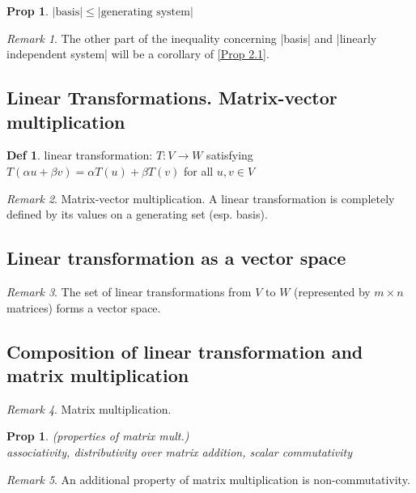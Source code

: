 \documentclass[hidelinks]{article}
\theoremstyle{definition}
\newtheorem*{defin}{Def}
\theoremstyle{plain}
\newtheorem{proposition}[theorem]{Prop}
\theoremstyle{remark}
\newtheorem*{remark}{Remark}
\begin{document}
\begin{proposition}
$|\textrm{basis}|\leq|\textrm{generating system}|$
\end{proposition}

\begin{remark}
The other part of the inequality concerning |basis| and |linearly independent system| will be a corollary of \autoref{Prop 2.1}.
\end{remark}

\subsection{Linear Transformations. Matrix-vector multiplication}

\begin{defin}
linear transformation: $T:V\to W$ satisfying $T(\alpha u+\beta v)=\alpha T(u)+\beta T(v)$ for all $u,v\in V$
\end{defin}

\begin{remark}
Matrix-vector multiplication. A linear transformation is completely defined by its values on a generating set (esp. basis).
\end{remark}

\subsection{Linear transformation as a vector space}

\begin{remark}
The set of linear transformations from $V$ to $W$ (represented by $m\times n$ matrices) forms a vector space.
\end{remark}

\subsection{Composition of linear transformation and matrix multiplication}

\begin{remark}
Matrix multiplication.
\end{remark}

\begin{proposition} (properties of matrix mult.) \\
associativity, distributivity over matrix addition, scalar commutativity
\end{proposition}

\begin{remark}
An additional property of matrix multiplication is non-commutativity.
\end{remark}
\end{document}
